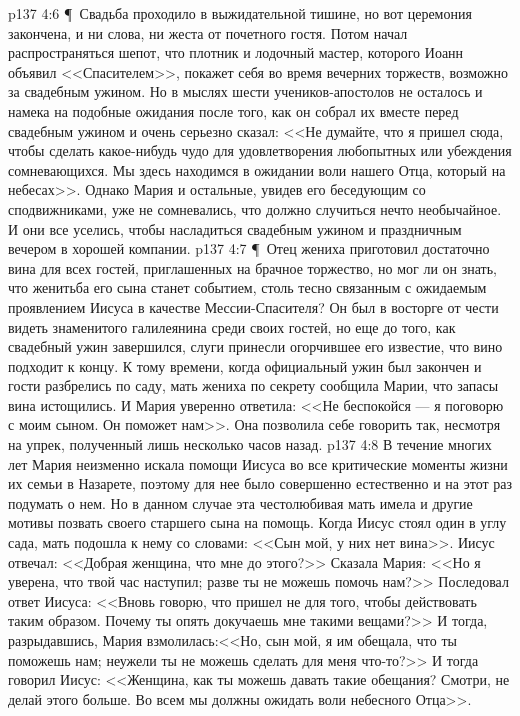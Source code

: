 \vs p137 4:6 \P\ Свадьба проходило в выжидательной тишине, но вот церемония закончена, и ни слова, ни жеста от почетного гостя. Потом начал распространяться шепот, что плотник и лодочный мастер, которого Иоанн объявил <<Спасителем>>, покажет себя во время вечерних торжеств, возможно за свадебным ужином. Но в мыслях шести учеников\hyp{}апостолов не осталось и намека на подобные ожидания после того, как он собрал их вместе перед свадебным ужином и очень серьезно сказал: <<Не думайте, что я пришел сюда, чтобы сделать какое\hyp{}нибудь чудо для удовлетворения любопытных или убеждения сомневающихся. Мы здесь находимся в ожидании воли нашего Отца, который на небесах>>. Однако Мария и остальные, увидев его беседующим со сподвижниками, уже не сомневались, что должно случиться нечто необычайное. И они все уселись, чтобы насладиться свадебным ужином и праздничным вечером в хорошей компании.
\vs p137 4:7 \P\ Отец жениха приготовил достаточно вина для всех гостей, приглашенных на брачное торжество, но мог ли он знать, что женитьба его сына станет событием, столь тесно связанным с ожидаемым проявлением Иисуса в качестве Мессии\hyp{}Спасителя? Он был в восторге от чести видеть знаменитого галилеянина среди своих гостей, но еще до того, как свадебный ужин завершился, слуги принесли огорчившее его известие, что вино подходит к концу. К тому времени, когда официальный ужин был закончен и гости разбрелись по саду, мать жениха по секрету сообщила Марии, что запасы вина истощились. И Мария уверенно ответила: <<Не беспокойся --- я поговорю с моим сыном. Он поможет нам>>. Она позволила себе говорить так, несмотря на упрек, полученный лишь несколько часов назад.
\vs p137 4:8 В течение многих лет Мария неизменно искала помощи Иисуса во все критические моменты жизни их семьи в Назарете, поэтому для нее было совершенно естественно и на этот раз подумать о нем. Но в данном случае эта честолюбивая мать имела и другие мотивы позвать своего старшего сына на помощь. Когда Иисус стоял один в углу сада, мать подошла к нему со словами: <<Сын мой, у них нет вина>>. Иисус отвечал: <<Добрая женщина, что мне до этого?>> Сказала Мария: <<Но я уверена, что твой час наступил; разве ты не можешь помочь нам?>> Последовал ответ Иисуса: <<Вновь говорю, что пришел не для того, чтобы действовать таким образом. Почему ты опять докучаешь мне такими вещами?>> И тогда, разрыдавшись, Мария взмолилась:<<Но, сын мой, я им обещала, что ты поможешь нам; неужели ты не можешь сделать для меня что\hyp{}то?>> И тогда говорил Иисус: <<Женщина, как ты можешь давать такие обещания? Смотри, не делай этого больше. Во всем мы должны ожидать воли небесного Отца>>.
